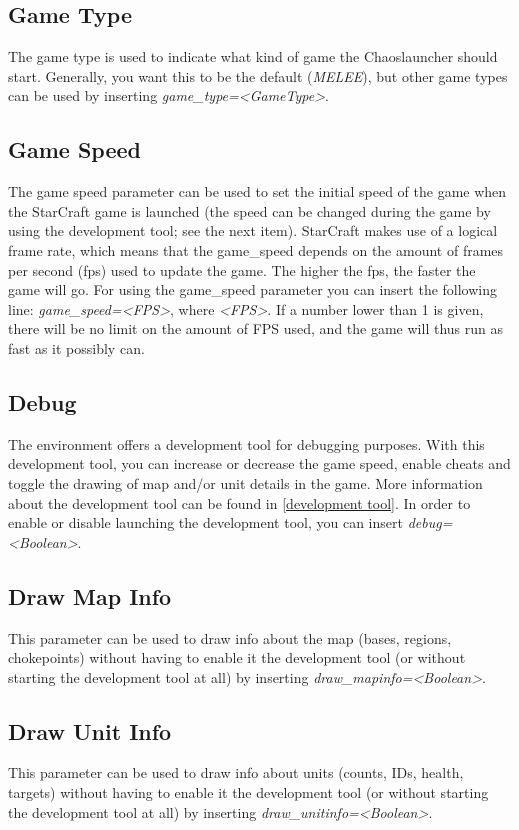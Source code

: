 \subsection{Game Type}
\label{game type}
The game type is used to indicate what kind of game the Chaoslauncher should start. Generally, you want this to be the default (\textit{MELEE}), but other game types can be used by inserting \textit{game\_type=<GameType>}.

\subsection{Game Speed}
\label{game speed}
The game speed parameter can be used to set the initial speed of the game when the StarCraft game is launched (the speed can be changed during the game by using the development tool; see the next item). StarCraft makes use of a logical frame rate, which means that the game\_speed depends on the amount of frames per second (fps) used to update the game. The higher the fps, the faster the game will go. For using the game\_speed parameter you can insert the following line: \textit{game\_speed=<FPS>}, where \textit{<FPS>}. If a number lower than 1 is given, there will be no limit on the amount of FPS used, and the game will thus run as fast as it possibly can.

\subsection{Debug}
\label{debug}
The environment offers a development tool for debugging purposes. With this development tool, you can increase or decrease the game speed, enable cheats and toggle the drawing of map and/or unit details in the game. More information about the development tool can be found in \ref{development tool}. In order to enable or disable launching the development tool, you can insert \textit{debug=<Boolean>}.

\subsection{Draw Map Info}
\label{draw map info}
This parameter can be used to draw info about the map (bases, regions, chokepoints) without having to enable it the development tool (or without starting the development tool at all) by inserting \textit{draw\_mapinfo=<Boolean>}.

\subsection{Draw Unit Info}
\label{draw unit info}
This parameter can be used to draw info about units (counts, IDs, health, targets) without having to enable it the development tool (or without starting the development tool at all) by inserting \textit{draw\_unitinfo=<Boolean>}.

